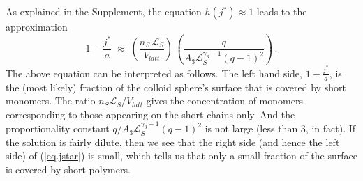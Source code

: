 \documentclass[journal=mamobx,manuscript=article]{achemso}
\newcommand{\leng}{\mathcal{L}}
\begin{document}


As explained in the Supplement, the equation
$h(j^*)\approx 1$ leads to the approximation
\begin{equation}
    \label{eq.jstar}
     1-\frac{j^*}{a}     \; \approx   \; 
        \left(  \frac{n_S\,\leng_S}{V_{latt} }\right) \,\left(   \frac{q}{A_3\leng_S^{\gamma_3-1}(q-1)^2}\right)  \,.
\end{equation}
The above equation can be interpreted as follows.  The left hand side, $1-\frac{j^*}{a}$, is the (most likely) fraction of the colloid sphere's surface that is covered by short monomers.  The ratio $n_S\leng_S/V_{latt}$ gives
the concentration of monomers corresponding to those appearing on the short chains only.
And the proportionality constant $q/A_3\leng_S^{\gamma_3-1}(q-1)^2$ is not large (less than 3, in fact).
If the solution is fairly dilute, then we see that the right side (and hence the left side) of (\ref{eq.jstar}) is small,
which tells us that only a small fraction of the surface is covered by short polymers.


\end{document}
